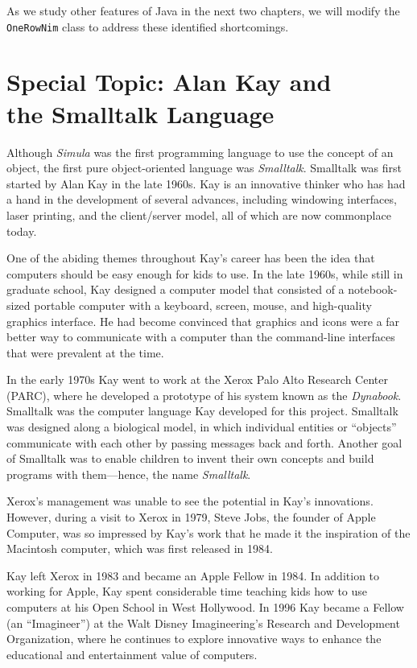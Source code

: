 \noindent As we study other features of Java in the next two chapters, 
we will modify the {\tt OneRowNim} class to address these identified
shortcomings.

\section*{{\color{cyan}Special Topic:} Alan Kay and \\
\hspace*{20pt} the Smalltalk Language}

{\color{cyan}Although {\it Simula}} was the first programming language
to use the concept of an object, the first pure object-oriented
language was {\it Smalltalk}.  Smalltalk was first started by Alan Kay
in the late 1960s.  Kay is an innovative thinker who has had a hand in
the development of several advances, including windowing interfaces,
laser printing, and the client/server model, all of which are now
commonplace today.

One of the abiding themes throughout Kay's career has been the idea
that computers should be easy enough for kids to use.  In the late
1960s, while still in graduate school, Kay designed a computer model
that consisted of a notebook-sized portable computer with a keyboard,
screen, mouse, and high-quality graphics interface. He had become
convinced that graphics and icons were a far better way to communicate
with a computer than the command-line interfaces that were prevalent
at the time.

In the early 1970s Kay went to work at the Xerox Palo Alto Research
Center (PARC), where he developed a prototype of his system known as
the {\it Dynabook}.  Smalltalk was the computer language Kay developed
for this project. Smalltalk was designed along a biological model, in
which individual entities or ``objects'' communicate with each other
by passing messages back and forth. Another goal of Smalltalk was to
enable children to invent their own concepts and build programs with
them---hence, the name {\it Smalltalk}.

Xerox's management was unable to see the potential in Kay's
innovations. However, during a visit to Xerox in 1979, Steve Jobs, the
founder of Apple Computer, was so impressed by Kay's work that he made
it the inspiration of the Macintosh computer, which was first released
in 1984.

Kay left Xerox in 1983 and became an Apple Fellow in 1984.  In
addition to working for Apple, Kay spent considerable time teaching
kids how to use computers at his Open School in West Hollywood.  In
1996 Kay became a Fellow (an ``Imagineer'') at the Walt Disney
Imagineering's Research and Development Organization, where he continues
to explore innovative ways to enhance the educational and
entertainment value of computers.

